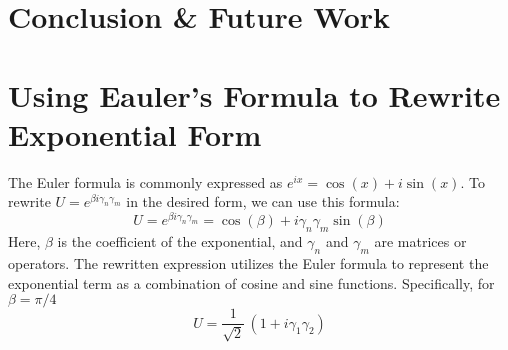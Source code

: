 \documentclass{article}
\begin{document}
\newpage
\section{Conclusion \& Future Work} %
\label{sec:Conclusion & Future Work}


\newpage
\appendix
\section{Using Eauler's Formula to Rewrite Exponential Form} %
\label{sec:Using Eauler's Formula Rewrite Exponential Form}
The Euler formula is commonly expressed as \(e^{ix} = \cos(x) + i \sin(x)\). To rewrite \(U = e^{\beta i \gamma_n \gamma_m}\) in the desired form, we can use this formula:
\[
	U = e^{\beta i \gamma_n \gamma_m} = \cos(\beta) + i \gamma_n \gamma_m \sin(\beta)
\]
Here, \(\beta\) is the coefficient of the exponential, and \(\gamma_n\) and \(\gamma_m\) are matrices or operators. The rewritten expression utilizes the Euler formula to represent the exponential term as a combination of cosine and sine functions. Specifically, for $ \beta = \pi / 4 $
$$ U = \frac{1}{\sqrt{2}}\, (1 + i \gamma_1 \gamma_2) $$
\end{document}

